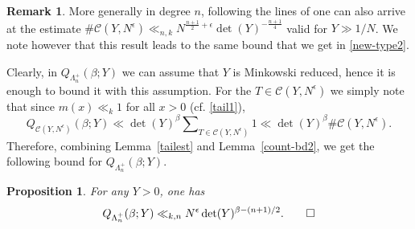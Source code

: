 \documentclass[11pt]{amsart}
\numberwithin{equation}{section}
\theoremstyle{plain}
\newtheorem{prop}[thm]{Proposition}
\theoremstyle{definition}
\newtheorem{rmk}[thm]{Remark}
\newcommand{\lemref}[1]{Lemma~\ref{#1}}
\newcommand{\mc}{\mathcal}
\newcommand{\sumn}{\sum \nolimits}
\begin{document}
\begin{rmk}
    More generally in degree $n$, following the lines of \cite[Lem.~4.9]{sd-hk} one can also arrive at the estimate $\# \mc C(Y, N^\epsilon)
    \ll_{n,k} N^{\frac{n+1}{2}+\epsilon}\det(Y)^{-\frac{n+1}{4}}$ valid for $Y \gg 1/N$. We note however that this result leads to the same bound that we get in \eqref{new-type2}.
\end{rmk}

Clearly, in $Q_{\Lambda_n^+}(\beta; Y)$ we can assume that $Y$ is Minkowski reduced, hence it is enough to bound it with this assumption. For the $T \in \mc C(Y, N^\epsilon)$ we simply note that since $m(x) \ll_k 1$ for all $x>0$ (cf. \eqref{tail1}),
\begin{equation}
     Q_{\mc C(Y, N^\epsilon)}(\beta;Y) \ll \det(Y)^\beta
     \sumn_{T \in \mc C(Y, N^\epsilon)} 1 \ll \det(Y)^\beta \# \mc C(Y, N^\epsilon).
\end{equation}
Therefore, combining \lemref{tailest} and \lemref{count-bd2}, we get the following bound for $Q_{\Lambda_n^+}(\beta; Y)$.
\begin{prop}\label{prop:QbY}
For any $Y>0$, one has
\begin{equation}
     Q_{\Lambda_n^+}(\beta; Y)\ll_{k,n} N^{\epsilon}\det(Y)^{\beta-(n+1)/2} .\qedhere
\end{equation}   
\end{prop}
\end{document}
